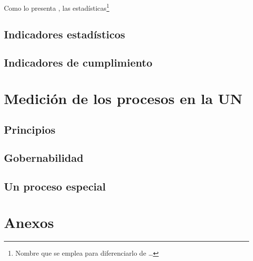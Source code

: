 \documentclass[]{book}
\let\rmarkdownfootnote\footnote%
\def\footnote{\protect\rmarkdownfootnote}
\begin{document}
Como lo presenta \citet{Alberto2019}, las estadísticas\footnote{Nombre
  que se emplea para diferenciarlo de \ldots{}}

\hypertarget{indicadores-estadisticos}{%
\section{Indicadores estadísticos}\label{indicadores-estadisticos}}

\hypertarget{indicadores-de-cumplimiento}{%
\section{Indicadores de
cumplimiento}\label{indicadores-de-cumplimiento}}

\hypertarget{indicadoresUN}{%
\chapter{Medición de los procesos en la UN}\label{indicadoresUN}}

\hypertarget{principios}{%
\section{Principios}\label{principios}}

\hypertarget{gobernabilidad}{%
\section{Gobernabilidad}\label{gobernabilidad}}

\hypertarget{un-proceso-especial}{%
\section{Un proceso especial}\label{un-proceso-especial}}

\hypertarget{anexos}{%
\chapter*{Anexos}\label{anexos}}


\end{document}
